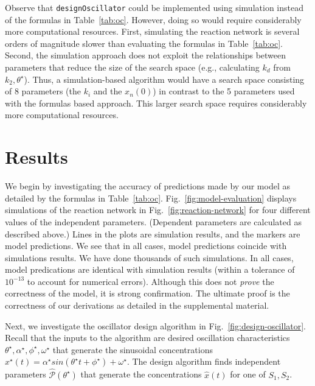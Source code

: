 \documentclass{bmcart}
\newcommand{\fig}[1]{Fig.~\ref{#1}}
\newcommand{\tab}[1]{Table~\ref{#1}}
\begin{document}
Observe that {\tt designOscillator} could be implemented using simulation instead of the formulas in \tab{tab:oc}. However, doing so would require considerably more computational resources. First, simulating the reaction network is several orders of magnitude slower than evaluating the formulas in \tab{tab:oc}. Second, the simulation approach does not exploit the relationships between parameters that reduce the size of the search space (e.g.,  calculating $k_d$ from $k_2, \theta^{\star}$). Thus, a simulation-based algorithm would have a search space consisting of 8 parameters (the $k_i$ and the $x_n(0)$) in contrast to the 5 parameters used with the formulas based approach. This larger search space requires considerably more computational resources.

\section*{Results}\label{sec:results}
We begin by investigating the accuracy of predictions made by our model as detailed
by the formulas in \tab{tab:oc}.
\fig{fig:model-evaluation}
displays simulations of the reaction network in
\fig{fig:reaction-network} for four different values of the independent parameters. (Dependent parameters are calculated as described above.)
Lines in the plots
are simulation results, and the markers are model predictions.
We see that in all cases, model predictions coincide with simulations results.
We have done thousands of such simulations.
In all cases,
model predications are identical with simulation results (within a tolerance
of $10^{-13}$ to account for numerical errors).
Although this does not {\em prove} the correctness of the model, it is
strong confirmation. The ultimate proof is the correctness of our derivations
as detailed in the supplemental material.

Next, we investigate the oscillator design algorithm in
\fig{fig:design-oscillator}. Recall that the inputs to the algorithm are desired oscillation characteristics
$\theta^{\star}, \alpha^{\star}, \phi^{\star}, \omega^{\star}$ that generate the sinusoidal concentrations $x^{\star}(t) = \alpha^{\star} sin(\theta^{\star} t + \phi^{\star}) + \omega^{\star}$.
The design algorithm finds independent parameters $\hat{\mathcal{P}} (\theta^{\star})$ that generate the concentrations $\hat{x} (t)$ for one of $S_1, S_2$.
\end{document}
